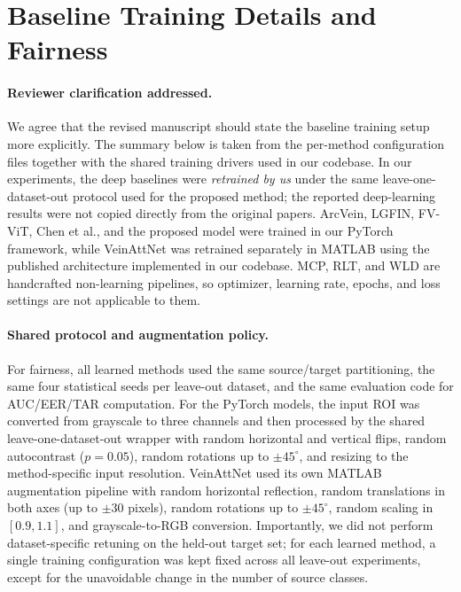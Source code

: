 \documentclass[11pt]{article}
\begin{document}
\section*{Baseline Training Details and Fairness}

\paragraph{Reviewer clarification addressed.}
We agree that the revised manuscript should state the baseline training setup more explicitly. The summary below is taken from the per-method configuration files together with the shared training drivers used in our codebase. In our experiments, the deep baselines were \emph{retrained by us} under the same leave-one-dataset-out protocol used for the proposed method; the reported deep-learning results were not copied directly from the original papers. ArcVein, LGFIN, FV-ViT, Chen et al., and the proposed model were trained in our PyTorch framework, while VeinAttNet was retrained separately in MATLAB using the published architecture implemented in our codebase. MCP, RLT, and WLD are handcrafted non-learning pipelines, so optimizer, learning rate, epochs, and loss settings are not applicable to them.

\paragraph{Shared protocol and augmentation policy.}
For fairness, all learned methods used the same source/target partitioning, the same four statistical seeds per leave-out dataset, and the same evaluation code for AUC/EER/TAR computation. For the PyTorch models, the input ROI was converted from grayscale to three channels and then processed by the shared leave-one-dataset-out wrapper with random horizontal and vertical flips, random autocontrast ($p=0.05$), random rotations up to $\pm 45^\circ$, and resizing to the method-specific input resolution. VeinAttNet used its own MATLAB augmentation pipeline with random horizontal reflection, random translations in both axes (up to $\pm 30$ pixels), random rotations up to $\pm 45^\circ$, random scaling in $[0.9, 1.1]$, and grayscale-to-RGB conversion. Importantly, we did not perform dataset-specific retuning on the held-out target set; for each learned method, a single training configuration was kept fixed across all leave-out experiments, except for the unavoidable change in the number of source classes.
\end{document}
